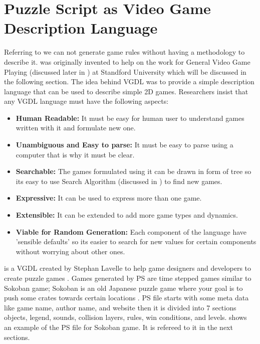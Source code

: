 \section{Puzzle Script as Video Game Description Language}
Referring to  we can not generate game rules without having a methodology to describe it.  was originally invented to help on the work for General Video Game Playing (discussed later in ) at Standford University which will be discussed in the following section. The idea behind VGDL was to provide a simple description language that can be used to describe simple 2D games. Researchers insist that any VGDL language must have the following aspects:\cite{vgdl}
\begin{itemize}\itemsep0pt \parskip0pt 
	\item \textbf{Human Readable:} It must be easy for human user to understand games written with it and formulate new one.
	\item \textbf{Unambiguous and Easy to parse:} It must be easy to parse using a computer that is why it must be clear.
	\item \textbf{Searchable:} The games formulated using it can be drawn in form of tree so its easy to use Search Algorithm (discussed in ) to find new games.
	\item \textbf{Expressive:} It can be used to express more than one game.
	\item \textbf{Extensible:} It can be extended to add more game types and dynamics.
	\item \textbf{Viable for Random Generation:} Each component of the language have 'sensible defaults' so its easier to search for new values for certain components without worrying about other ones.
\end{itemize}

 is a VGDL created by Stephan Lavelle to help game designers and developers to create puzzle games \cite{puzzleScript}. Games generated by PS are time stepped games similar to Sokoban game; Sokoban is an old Japanese puzzle game where your goal is to push some crates towards certain locations \cite{sokoban}. PS file starts with some meta data like game name, author name, and website then it is divided into 7 sections objects, legend, sounds, collision layers, rules, win conditions, and levels.  shows an example of the PS file for Sokoban game. It is refereed to it in the next sections.
